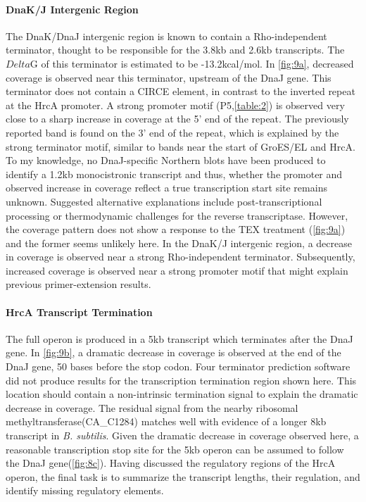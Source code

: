 \paragraph{DnaK/J Intergenic Region}
The DnaK/DnaJ intergenic region is known to contain a Rho-independent terminator\cite{79,82}, thought to be responsible for the 3.8kb and 2.6kb transcripts. The \(Delta\)G of this terminator is estimated to be -13.2kcal/mol. In \ref{fig:9a}, decreased coverage is observed near this terminator, upstream of the DnaJ gene. This terminator does not contain a CIRCE element, in contrast to the inverted repeat at the HrcA promoter. A strong promoter motif (P5,\ref{table:2}) is observed very close to a sharp increase in coverage at the 5' end of the repeat. The previously reported band is found on the 3' end of the repeat, which is explained by the strong terminator motif, similar to bands near the start of GroES/EL and HrcA. To my knowledge, no DnaJ-specific Northern blots have been produced to identify a 1.2kb monocistronic transcript and thus, whether the promoter and observed increase in coverage reflect a true transcription start site remains unknown. Suggested alternative explanations include post-transcriptional processing or thermodynamic challenges for the reverse transcriptase\cite{79}. However, the coverage pattern does not show a response to the TEX treatment (\ref{fig:9a}) and the former seems unlikely here. In the DnaK/J intergenic region, a decrease in coverage is observed near a strong Rho-independent terminator. Subsequently, increased coverage is observed near a strong promoter motif that might explain previous primer-extension results\cite{79}.


\paragraph{HrcA Transcript Termination}
The full operon is produced in a 5kb transcript which terminates after the DnaJ gene. In \ref{fig:9b}, a dramatic decrease in coverage is observed at the end of the DnaJ gene, 50 bases before the stop codon. Four terminator prediction software did not produce results for the transcription termination region shown here. This location should contain a non-intrinsic termination signal to explain the dramatic decrease in coverage. The residual signal from the nearby ribosomal methyltransferase(CA_C1284) matches well with evidence of a longer 8kb transcript in \textit{B. subtilis}\cite{82}. Given the dramatic decrease in coverage observed here, a reasonable transcription stop site for the 5kb operon can be assumed to follow the DnaJ gene(\ref{fig:8c}). Having discussed the regulatory regions of the HrcA operon, the final task is to summarize the transcript lengths, their regulation, and identify missing regulatory elements.


